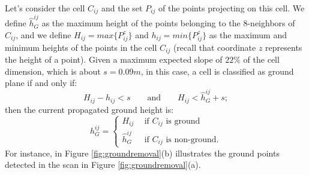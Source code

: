 Let's consider the cell $C_{ij}$ and the set $P_{ij}$ of the points projecting on this cell. 
We define $\hat{h}_G^{ij}$ as the maximum height of the points belonging to the 8-neighbors of $C_{ij}$, and we define $H_{ij} = max\{P_{ij}^z\}$ and $h_{ij} = min\{P_{ij}^z\}$ as the maximum and minimum heights of the points in the cell $C_{ij}$ (recall that coordinate $z$ represents the height of a point). 
Given a maximum expected slope of $22\%$ of the cell dimension, which is about $s=0.09m$, in this case, a cell is classified as ground plane if and only if:
\begin{equation}
H_{ij} - h_{ij} < s \qquad \text{and} \qquad H_{ij} < \hat{h}_G^{ij} + s;
\end{equation}
then the current propagated ground height is:
\begin{equation}
   h_G^{ij} =  
      \begin{cases}
               H_{ij} \ \ & \text{if ${C}_{ij}$ is ground}\\
               \hat{h}_G^{ij} \ \ & \text{if ${C}_{ij}$ is non-ground}.
        \end{cases}
\end{equation}
For instance, in Figure \ref{fig:groundremoval}(b) illustrates the ground points detected in the scan in Figure \ref{fig:groundremoval}(a).



